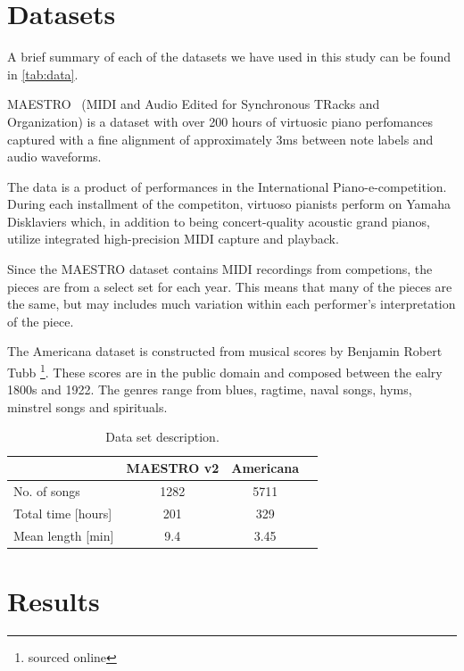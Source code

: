 \documentclass{IEEEtran}
\begin{document}
\section{Datasets}

A brief summary of each of the datasets we have used in this study can be
found in \autoref{tab:data}.

MAESTRO~\cite{maestrodataset} (MIDI and Audio Edited for Synchronous
TRacks and Organization) is a dataset with over 200 hours of virtuosic piano
perfomances captured with a fine alignment of approximately 3ms between note
labels and audio waveforms.

The data is a product of performances in the International
Piano-e-competition. During each installment of the competiton, virtuoso
pianists perform on Yamaha Disklaviers which, in addition to being
concert-quality acoustic grand pianos, utilize integrated high-precision MIDI
capture and playback.

Since the MAESTRO dataset contains MIDI recordings from competions,
the pieces are from a select set for each year. This means that many of the
pieces are the same, but may includes much variation within each performer's
interpretation of the piece.

The Americana dataset is constructed from musical scores by Benjamin
Robert Tubb \footnote{sourced online}. These
scores are in the public domain and composed between the ealry 1800s and
1922. The genres range from blues, ragtime, naval songs, hyms, minstrel songs
and spirituals.

\begin{table}
    \begin{center}
    \caption{
        Data set description.
        \label{tab:data}
    }
    \begin{tabular}{l c c c} \hline
            & MAESTRO v2 & Americana \\ \hline\hline
        No. of songs & 1282 & 5711 \\ \hline
        Total time [hours] & 201 & 329 \\ \hline
        Mean length [min] & 9.4 & 3.45 \\ \hline
    \end{tabular}
    \end{center}
\end{table}


\section{Results}
\end{document}
